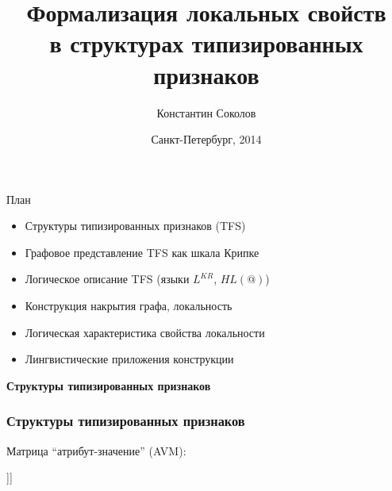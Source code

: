 \documentclass{beamer}
\begin{document}
\title{\Large{Формализация локальных свойств\\в структурах типизированных признаков}}
\author{Константин Соколов}
\date{Санкт-Петербург, 2014} 
\begin{frame}
    \thispagestyle{empty}
    \titlepage
\end{frame}

\begin{frame}{План}
    \setcounter{framenumber}{1}
    \begin{itemize}
        \item Структуры типизированных признаков (TFS)
        \item Графовое представление TFS как шкала Крипке
        \item Логическое описание TFS (языки $L^{KR}$, $HL(@)$)
        \item Конструкция накрытия графа, локальность
        \item Логическая характеристика свойства локальности
        \item Лингвистические приложения конструкции  %
    \end{itemize}
\end{frame}

\begin{frame}{}
\begin{center}
	\textbf{Структуры типизированных признаков}
\end{center}
\end{frame}

\begin{frame}[fragile]
\frametitle{Структуры типизированных признаков}
Матрица ``атрибут-значение'' (AVM):\\
\begin{center}
	\begin{avm}
	[{action} predicate & on \cr
    	      Mood & imp \cr 
        	  Actor & @{1} \cr 
	          Patient & [{thing} predicate & @{2} лампа \cr
    	                         Num & sg \cr 
        	                     Modifier & [{q-color} predicate & красный\_adj ]]]
	\end{avm}
\end{center}	
\end{frame}
\end{document}
